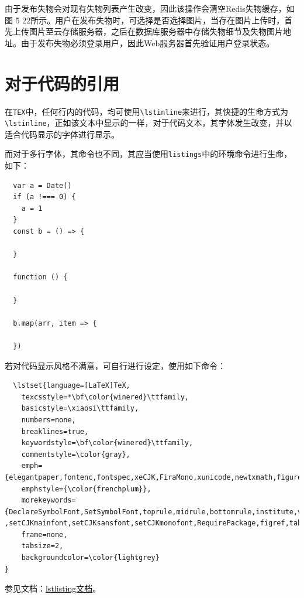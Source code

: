 \documentclass[oneside]{jufethesis}
\begin{document}
由于发布失物会对现有失物列表产生改变，因此该操作会清空Redis失物缓存，如图 5 22所示。用户在发布失物时，可选择是否选择图片，当存在图片上传时，首先上传图片至云存储服务器，之后在数据库服务器中存储失物细节及失物图片地址。由于发布失物必须登录用户，因此Web服务器首先验证用户登录状态。

\section{对于代码的引用}

在\lstinline{TEX}中，任何行内的代码，均可使用\lstinline{\lstinline}来进行，其快捷的生命方式为\lstinline!\lstinline!，正如该文本中显示的一样，对于代码文本，其字体发生改变，并以适合代码显示的字体进行显示。

而对于多行字体，其命令也不同，其应当使用\lstinline!listings!中的环境命令进行生命，如下：

\lstset{language=Java}  %
\begin{lstlisting}
  var a = Date()
  if (a !=== 0) {
    a = 1
  }
  const b = () => {

  }

  function () {

  }

  b.map(arr, item => {

  })
\end{lstlisting}
若对代码显示风格不满意，可自行进行设定，使用如下命令：

\begin{lstlisting}
  \lstset{language=[LaTeX]TeX,
	texcsstyle=*\bf\color{winered}\ttfamily,
	basicstyle=\xiaosi\ttfamily,
	numbers=none,
	breaklines=true,
	keywordstyle=\bf\color{winered}\ttfamily,
	commentstyle=\color{gray},
	emph={elegantpaper,fontenc,fontspec,xeCJK,FiraMono,xunicode,newtxmath,figure,fig,image,img,table,itemize,enumerate,newtxtext,newtxtt,ctex,microtype,description,times,newtx,booktabs,tabular,PDFLaTeX,XeLaTeX,type1cm,BibTeX},
	emphstyle={\color{frenchplum}},
	morekeywords={DeclareSymbolFont,SetSymbolFont,toprule,midrule,bottomrule,institute,version,includegraphics,setmainfont,setsansfont,setmonofont ,setCJKmainfont,setCJKsansfont,setCJKmonofont,RequirePackage,figref,tabref,email,maketitle,keywords},
	frame=none,
	tabsize=2,
	backgroundcolor=\color{lightgrey}
}
\end{lstlisting}

参见文档：\href{http://texdoc.net/texmf-dist/doc/latex/listings/
listings.pdf}{lstlisting文档}。

\Thanksto
\end{document}
